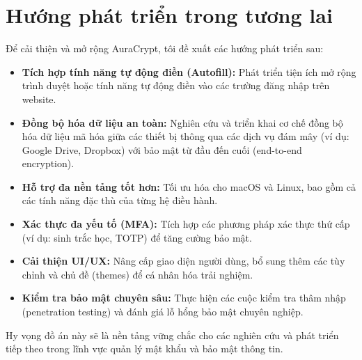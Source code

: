 \section{Hướng phát triển trong tương lai}
Để cải thiện và mở rộng AuraCrypt, tôi đề xuất các hướng phát triển sau:
\begin{itemize}
    \item \textbf{Tích hợp tính năng tự động điền (Autofill):} Phát triển tiện ích mở rộng trình duyệt hoặc tính năng tự động điền vào các trường đăng nhập trên website.
    \item \textbf{Đồng bộ hóa dữ liệu an toàn:} Nghiên cứu và triển khai cơ chế đồng bộ hóa dữ liệu mã hóa giữa các thiết bị thông qua các dịch vụ đám mây (ví dụ: Google Drive, Dropbox) với bảo mật từ đầu đến cuối (end-to-end encryption).
    \item \textbf{Hỗ trợ đa nền tảng tốt hơn:} Tối ưu hóa cho macOS và Linux, bao gồm cả các tính năng đặc thù của từng hệ điều hành.
    \item \textbf{Xác thực đa yếu tố (MFA):} Tích hợp các phương pháp xác thực thứ cấp (ví dụ: sinh trắc học, TOTP) để tăng cường bảo mật.
    \item \textbf{Cải thiện UI/UX:} Nâng cấp giao diện người dùng, bổ sung thêm các tùy chỉnh và chủ đề (themes) để cá nhân hóa trải nghiệm.
    \item \textbf{Kiểm tra bảo mật chuyên sâu:} Thực hiện các cuộc kiểm tra thâm nhập (penetration testing) và đánh giá lỗ hổng bảo mật chuyên nghiệp.
\end{itemize}

Hy vọng đồ án này sẽ là nền tảng vững chắc cho các nghiên cứu và phát triển tiếp theo trong lĩnh vực quản lý mật khẩu và bảo mật thông tin.
\newpage